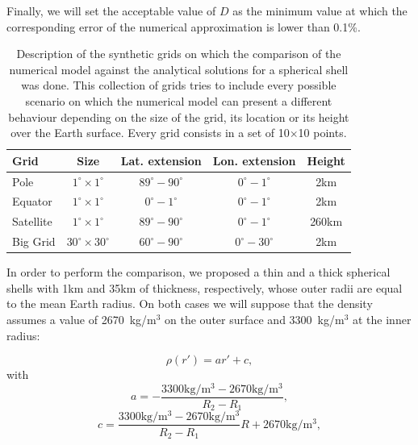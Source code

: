 \documentclass[extra]{gji}
\begin{document}
Finally, we will set the acceptable value of $D$ as the minimum value 
at which the corresponding error of the numerical approximation is 
lower than 0.1\%.

\begin{table}
\caption{
    Description of the synthetic grids on which the comparison of the 
    numerical model against the analytical solutions for a spherical 
    shell was done.
    This collection of grids tries to include every possible scenario 
    on which the numerical model can present a different behaviour 
    depending on the size of the grid, its location or its height over 
    the Earth surface. Every grid consists in a set of 10$\times$10 
    points.
}
\label{tab:grids}
\begin{tabular}{lcccc}
    Grid & Size & Lat. extension & Lon. extension & Height \\ \hline
    Pole & $1^\circ \times 1^\circ$ & $89^\circ - 90^\circ$ &
        $0^\circ - 1^\circ$ & 2km \\
    Equator & $1^\circ \times 1^\circ$ & $0^\circ - 1^\circ$ &
        $0^\circ - 1^\circ$ & 2km \\
    Satellite & $1^\circ \times 1^\circ$ & $89^\circ - 90^\circ$ &
        $0^\circ - 1^\circ$ & 260km \\
    Big Grid & $30^\circ \times 30^\circ$ & $60^\circ - 90^\circ$ &
        $0^\circ - 30^\circ$ & 2km \\
\end{tabular}
\end{table}

In order to perform the comparison, we proposed a thin and a thick 
spherical shells with 1km and 35km of thickness, respectively, whose 
outer radii are equal to the mean Earth radius.
On both cases we will suppose that the density assumes a value of 
2670~kg/m$^3$ on the outer surface and 3300~kg/m$^3$ at the inner 
radius:

\begin{equation}
    \rho(r') = ar' + c,
    \label{eq:density-linear}
\end{equation}
\noindent with 
\begin{equation}
    a = -\frac{3300\text{kg/m$^3$} - 2670\text{kg/m$^3$}}{R_2 - R_1},
\end{equation}
\begin{equation}
    c = \frac{3300\text{kg/m$^3$} - 
        2670\text{kg/m$^3$}}{R_2 - R_1} R + 
        2670\text{kg/m$^3$},
\end{equation}
\end{document}
